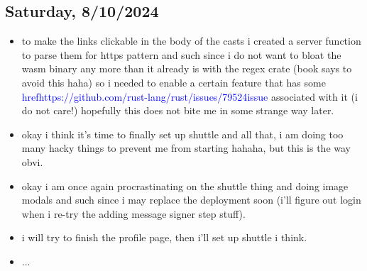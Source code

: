 \subsection*{Saturday, 8/10/2024}
\begin{itemize}
    \item to make the links clickable in the body of the casts i created a
        server function to parse them for https pattern and such since i do not
        want to bloat the wasm binary any more than it already is with the regex
        crate (book says to avoid this haha) so i needed to enable a certain
        feature that has some 
        \textcolor{blue}{href{https://github.com/rust-lang/rust/issues/79524}{issue}}
        associated with it (i do not care!)
        hopefully this does not bite me in some strange way later.
    \item okay i think it's time to finally set up shuttle and all that, i am
        doing too many hacky things to prevent me from starting hahaha, but this
        is the way obvi.
    \item okay i am once again procrastinating on the shuttle thing and doing
        image modals and such since i may replace the deployment soon (i'll
        figure out login when i re-try the adding message signer step stuff).
    \item i will try to finish the profile page, then i'll set up shuttle i
        think.
    \item ...
\end{itemize}
